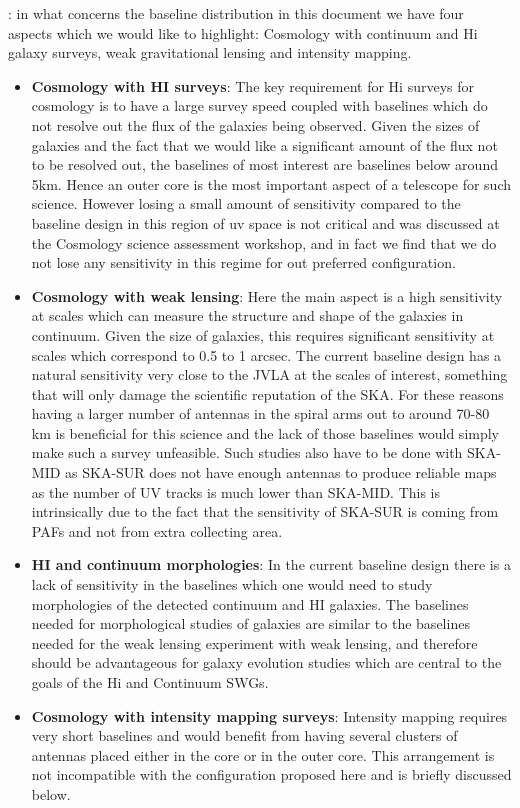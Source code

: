 \documentclass[sfheadings,a4paper,times,9pt,floats,floatfix]{article}
\begin{document}
\smallskip
{}: in what concerns the baseline distribution in this document we have four
aspects which we would like to highlight: Cosmology with continuum and
H{\sc i} galaxy surveys, weak
gravitational lensing and intensity mapping.\\
\begin{itemize}
\item {\bf Cosmology with HI surveys}: The key requirement for H{\sc i}
surveys for cosmology is to have a large
survey speed coupled with baselines which do not resolve out the flux of the galaxies being
observed. Given the sizes of galaxies and the fact that we would like a significant amount of
the flux not to be resolved out, the baselines of most interest are baselines below around
5km. Hence an outer core is the most important aspect of a telescope for such science.
However losing a small amount of sensitivity compared to the baseline design in this region
of uv space is not critical and was discussed at the Cosmology science
assessment workshop, and in fact we find that we do not lose any
sensitivity in this regime for out preferred configuration. 

\item {\bf Cosmology with weak lensing}: Here the main aspect is a high sensitivity at scales which can
measure the structure and shape of the galaxies in continuum. Given the size of galaxies,
this requires significant sensitivity at scales which correspond to
0.5 to 1 arcsec. The current baseline design has a natural sensitivity
very close to the JVLA at the scales of interest, something that will
only damage the scientific reputation of the SKA. 
For these reasons having a larger number of antennas in the spiral arms out to around 70-80
km is beneficial for this science and the lack of those baselines would simply make such a
survey unfeasible. Such studies also have to be done with SKA-MID as SKA-SUR does not have
enough antennas to produce reliable maps as the number of UV tracks is much lower than
SKA-MID. This is intrinsically due to the fact that the sensitivity of SKA-SUR is coming from
PAFs and not from extra collecting area.

\item {\bf HI and continuum morphologies}: In the current baseline design there is a lack of sensitivity
in the baselines which one would need to study morphologies of the detected continuum
and HI galaxies. The baselines needed for morphological studies of galaxies
are similar to the baselines needed for the weak lensing experiment
with weak lensing, and therefore should be advantageous for galaxy
evolution studies which are central to the goals of the H{\sc i} and
Continuum SWGs.

\item {\bf Cosmology with intensity mapping surveys}: Intensity mapping requires very short baselines
and would benefit from having several clusters of antennas placed either in the core or in
the outer core. This arrangement is not incompatible with the configuration
proposed here and is briefly discussed below.
\end{itemize}
\end{document}
